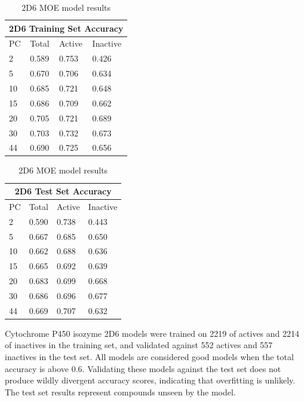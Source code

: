 \begin{table}[!htbp]
\begin{minipage}{.5\linewidth}
\centering
\begin{tabular}{|l|l|l|l|}
\hline
\multicolumn{4}{|c|}{2D6 Training Set Accuracy} \\ \hline
PC & Total          & Active          & Inactive\\ \hline
2  & 0.589          & 0.753           & 0.426   \\ \hline
5  & 0.670          & 0.706           & 0.634   \\ \hline
10 & 0.685          & 0.721           & 0.648   \\ \hline
15 & 0.686          & 0.709           & 0.662   \\ \hline
20 & 0.705          & 0.721           & 0.689   \\ \hline
30 & 0.703          & 0.732           & 0.673   \\ \hline
44 & 0.690          & 0.725           & 0.656   \\ \hline
\end{tabular}
\end{minipage}
\begin{minipage}{.5\linewidth}
\centering
\begin{tabular}{|l|l|l|l|}
\hline
\multicolumn{4}{|c|}{2D6 Test Set Accuracy}      \\ \hline
PC & Total          & Active          & Inactive \\ \hline
2  & 0.590          & 0.738           & 0.443    \\ \hline
5  & 0.667          & 0.685           & 0.650    \\ \hline
10 & 0.662          & 0.688           & 0.636    \\ \hline
15 & 0.665          & 0.692           & 0.639    \\ \hline
20 & 0.683          & 0.699           & 0.668    \\ \hline
30 & 0.686          & 0.696           & 0.677    \\ \hline
44 & 0.669          & 0.707           & 0.632    \\ \hline
\end{tabular}
\end{minipage}
\caption{2D6 MOE model results}
\end{table}

Cytochrome P450 isozyme 2D6 models were trained on 2219 of actives and 2214 of inactives in the training set, and validated against 552 actives and 557 inactives in the test set. All models are considered good models when the total accuracy is above 0.6. Validating these models against the test set does not produce wildly divergent accuracy scores, indicating that overfitting is unlikely. The test set results represent compounds unseen by the model. 

